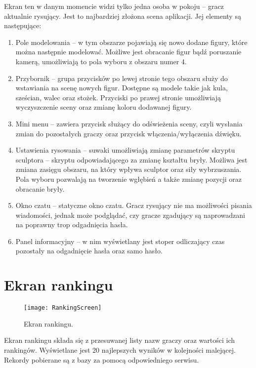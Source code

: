 Ekran ten w danym momencie widzi tylko jedna osoba w pokoju – gracz aktualnie rysujący. Jest to najbardziej złożona scena aplikacji. Jej elementy są następujące:
\begin{enumerate}
    \item Pole modelowania – w tym obszarze pojawiają się nowo dodane figury, które można następnie modelować. Możliwe jest obracanie figur bądź poruszanie kamerą, umożliwiają to pola wyboru z obszaru numer 4.
    \item Przybornik – grupa przycisków po lewej stronie tego obszaru służy do wstawiania na scenę nowych figur. Dostępne są modele takie jak kula, sześcian, walec oraz stożek. Przyciski po prawej stronie umożliwiają wyczyszczenie sceny oraz zmianę koloru dodawanej figury.
    \item Mini menu – zawiera przycisk służący do odświeżenia sceny, czyli wysłania zmian do pozostałych graczy oraz przycisk włączenia/wyłączenia dźwięku.
    \item Ustawienia rysowania – suwaki umożliwiają zmianę parametrów skryptu sculptora – skryptu odpowiadającego za zmianę kształtu bryły. Możliwa jest zmiana zasięgu obszaru, na który wpływa sculptor oraz siły wybrzuszania. Pola wyboru pozwalają na tworzenie wgłębień a także zmianę pozycji oraz obracanie bryły.
    \item Okno czatu – statyczne okno czatu. Gracz rysujący nie ma możliwości pisania wiadomości, jednak może podglądać, czy gracze zgadujący są naprowadzani na poprawny trop odgadnięcia hasła.
    \item Panel informacyjny – w nim wyświetlany jest stoper odliczający czas pozostały na odgadnięcie hasła oraz samo hasło.
\end{enumerate}

\section{Ekran rankingu}
\begin{figure}[htbp]
\centering
\texttt{[image: RankingScreen]}
\caption{Ekran rankingu.}
\label{fig:rankingscreen}
\end{figure}

Ekran rankingu składa się z przesuwanej listy nazw graczy oraz wartości ich rankingów. Wyświetlane jest 20 najlepszych wyników w kolejności malejącej. Rekordy pobierane są z bazy za pomocą odpowiedniego serwisu.	